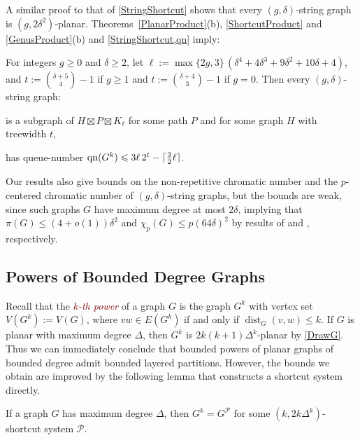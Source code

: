 \documentclass{patmorin}
\newcommand{\defin}[1]{\textcolor{Maroon}{\emph{#1}}}
\DeclareMathOperator{\dist}{dist}
\DeclareMathOperator{\qn}{qn}
\DeclarePairedDelimiter{\ceil}{\lceil}{\rceil}
\newcommand{\PP}{\mathcal{P}}
\renewcommand{\le}{\leqslant}
\renewcommand{\geq}{\geqslant}
\renewcommand{\leq}{\leqslant}
\begin{document}
A similar proof to that of \cref{StringShortcut} shows that every $(g,\delta)$-string graph is $(g,2\delta^2)$-planar. Theorems~\ref{PlanarProduct}(b), \ref{ShortcutProduct}  and \ref{GenusProduct}(b) and \cref{StringShortcut,qn} imply:

\begin{thm}
\label{StringPartition}
For integers $g\geq 0$ and $\delta\geq 2$, let $\ell:= \max\{2g,3\} \,(\delta^4 + 4 \delta^3 + 9 \delta^2 + 10 \delta + 4)$, 
and $t:= \binom{ \delta+5}{4}-1$ if $g\geq 1$ and $t:= \binom{ \delta+4}{3}-1$ if $g=0$. 
Then  every $(g,\delta)$-string graph: 
\begin{compactitem}
	\item is a subgraph of $H\boxtimes P \boxtimes K_{\ell}$ for some path $P$ and for some graph $H$ with treewidth $t$,
	\item has queue-number $\qn(G^k) \leq 3 \ell \, 2^t - \ceil{\tfrac{3}{2}\ell}$.
\end{compactitem}
\end{thm}

Our results also give bounds on the non-repetitive chromatic number and the $p$-centered chromatic number of $(g,\delta)$-string graphs, but the bounds are weak, since such graphs $G$ have maximum degree at most $2\delta$, implying that $\pi(G) \leq (4+o(1))\delta^2$ and $\chi_p(G)\le p(64\delta)^2$ by results of \citet{DJKW16} and \citet{DFMS21}, respectively.

\subsection{Powers of Bounded Degree Graphs}
\label{Powers}

Recall that the \defin{$k$-th power} of a graph $G$ is the graph $G^k$ with vertex set $V(G^k):=V(G)$, where $vw\in E(G^k)$ if and only if $\dist_G(v,w)\leq k$. If $G$ is planar with maximum degree $\Delta$, then $G^k$ is $2k(k+1)\Delta^{k}$-planar by \cref{DrawG}. Thus we can immediately conclude that bounded powers of planar graphs of bounded degree admit bounded layered partitions. However, the bounds we obtain are improved by the following lemma that constructs a shortcut system directly.

\begin{lem}
\label{PowerShortcut}
If a graph $G$ has maximum degree $\Delta$, then $G^k = G^\PP$ for some $(k,2k \Delta^{k})$-shortcut system $\PP$.
\end{lem}
\end{document}
